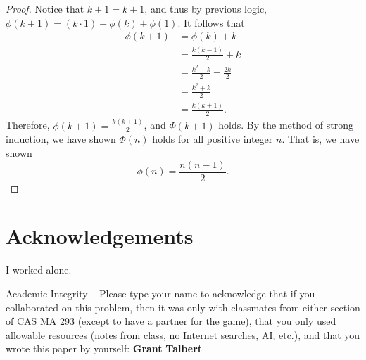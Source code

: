 \documentclass[11pt, letterpaper]{report}
\begin{document}
\begin{proof}
Notice that $k+1=k+1$, and thus by previous logic, $\phi (k+1)=(k\cdot 1)+\phi  (k)+\phi  (1)$. It follows that
\begin{align*}
	\phi  (k+1)&=\phi  (k)+k\\
		  &=\frac{k(k-1)}{2}+k\\
		  &=\frac{k^2-k}{2}+\frac{2k}{2}\\
		  &=\frac{k^2+k}{2}\\
		  &=\frac{k(k+1)}{2}
.\end{align*}
Therefore, $\phi  (k+1)=\frac{k(k+1)}{2}$, and $\Phi (k+1) $ holds. By the method of strong induction, we have shown $\Phi (n)$ holds for all positive integer $n$. That is, we have shown
\[
	\phi  (n)=\frac{n(n-1)}{2}
.\]
\end{proof}
\section*{Acknowledgements}
I worked alone.

Academic Integrity -- Please type your name to acknowledge that if
you collaborated on this problem, then it was only with classmates
from either section of CAS MA 293 (except to have a partner for the
game), that you only used allowable resources (notes from class, no
Internet searches, AI, etc.), and that you wrote this paper by
yourself: \textbf{Grant} \textbf{Talbert}
\end{document}
